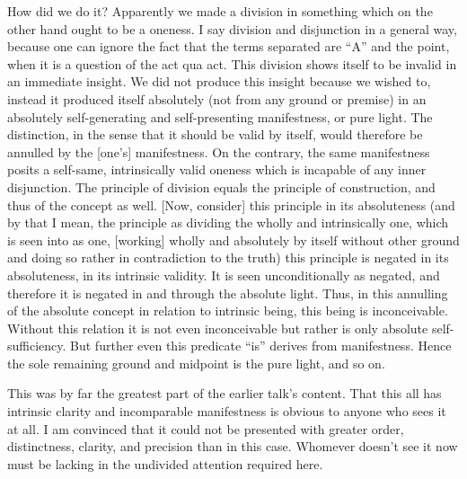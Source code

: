 How did we do it?
Apparently we made a division in something which
on the other hand ought to be a oneness.
I say division and disjunction in a general way,
because one can ignore the fact that the terms separated
are “A” and the point, when it is a question of the act qua act.
This division shows itself to be invalid in an immediate insight.
We did not produce this insight because we wished to,
instead it produced itself absolutely
(not from any ground or premise)
in an absolutely self-generating
and self-presenting manifestness,
or pure light.
The distinction, in the sense that it should be valid by itself,
would therefore be annulled by the [one’s] manifestness.
On the contrary, the same manifestness posits
a self-same, intrinsically valid oneness
which is incapable of any inner disjunction.
The principle of division equals the principle of construction,
and thus of the concept as well.
[Now, consider] this principle in its absoluteness
(and by that I mean, the principle as dividing
the wholly and intrinsically one,
which is seen into as one,
[working] wholly and absolutely by itself
without other ground and doing so rather
in contradiction to the truth)
this principle is negated in its absoluteness,
in its intrinsic validity.
It is seen unconditionally as negated,
and therefore it is negated
in and through the absolute light.
Thus, in this annulling of the absolute concept
in relation to intrinsic being,
this being is inconceivable.
Without this relation it is not even inconceivable
but rather is only absolute self-sufficiency.
But further even this predicate “is”
derives from manifestness.
Hence the sole remaining ground and midpoint is
the pure light, and so on.

This was by far the greatest part
of the earlier talk’s content.
That this all has intrinsic clarity
and incomparable manifestness is
obvious to anyone who sees it at all.
I am convinced that it could not be presented
with greater order, distinctness, clarity,
and precision than in this case.
Whomever doesn’t see it now must be lacking
in the undivided attention required here.

